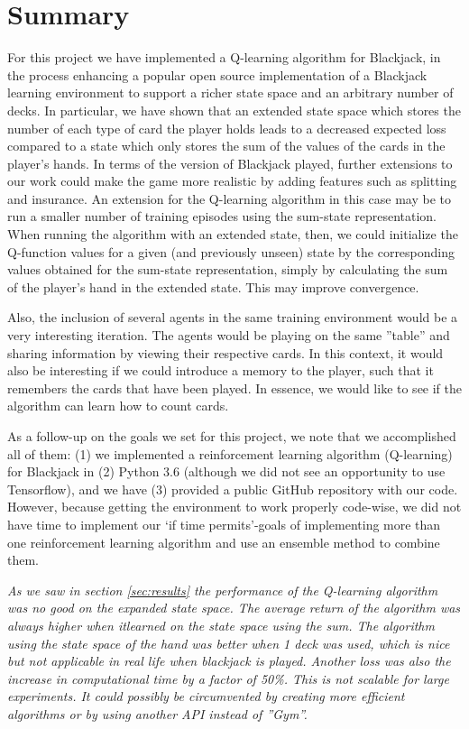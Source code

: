 \section{Summary} \label{sec:summary}
For this project we have implemented a Q-learning algorithm for Blackjack, in the process
enhancing a popular open source implementation of a Blackjack learning environment to
support a richer state space and an arbitrary number of decks. In particular, we have shown 
that an extended state space which stores the number of each type of card the player holds 
leads to a decreased expected loss compared to a state which only stores the sum of the 
values of the cards in the player's hands. In terms of the version of Blackjack played,
further extensions to our work could make the game more realistic by adding features such
as splitting and insurance. An extension for the Q-learning algorithm in this case may be
to run a smaller number of training episodes using the sum-state representation.
When running the algorithm with an extended state, then, we could initialize the Q-function
values for a given (and previously unseen) state by the corresponding values obtained for
the sum-state representation, simply by calculating the sum of the player's hand in the
extended state. This may improve convergence.

Also, the inclusion of several agents in the same training environment would be a very interesting iteration.
The agents would be playing on the same ''table'' and sharing information by viewing their respective cards. In
this context, it would also be interesting if we could introduce a memory to the player, such that it remembers
the cards that have been played. In essence, we would like to see if the algorithm can learn how to count cards. 

As a follow-up on the goals we set for this project, we note that we accomplished all of
them: (1) we implemented a reinforcement learning algorithm (Q-learning) for Blackjack
in (2) Python 3.6 (although we did not see an opportunity to use Tensorflow), and
we have (3) provided a public GitHub repository with our code. However, because getting the 
environment to work properly code-wise, we did not have time to implement our `if time permits'-goals
of implementing more than one reinforcement learning algorithm and use an ensemble method to
combine them.

\textit{
As we saw in section \ref{sec:results} the performance of the Q-learning algorithm was no good on the expanded state space. The average return of the algorithm was always higher when itlearned on the state space using the sum. The algorithm using the state space of the hand was better when 1 deck was used, which is nice but not applicable in real life when blackjack  is played.
Another loss was also the increase in computational time by a factor of 50\%. This is not scalable for large experiments. It could possibly be circumvented by creating more efficient 
algorithms or by using another API instead of ''Gym''.
}
